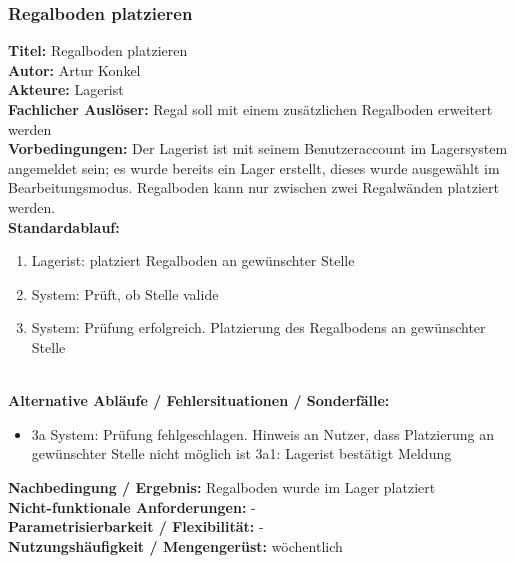 \subsubsection{Regalboden platzieren}
\textbf{Titel:} Regalboden platzieren\\
\textbf{Autor:} Artur Konkel\\
\textbf{Akteure:} Lagerist\\
\textbf{Fachlicher Auslöser:} Regal soll mit einem zusätzlichen Regalboden erweitert werden\\
\textbf{Vorbedingungen:} Der Lagerist ist mit seinem Benutzeraccount im Lagersystem angemeldet sein; es wurde
bereits ein Lager erstellt, dieses wurde ausgewählt im Bearbeitungsmodus. Regalboden kann nur zwischen zwei
Regalwänden platziert werden.\\
\textbf{Standardablauf:}
\begin{enumerate}
	\item Lagerist: platziert Regalboden an gewünschter Stelle
	\item System: Prüft, ob Stelle valide
	\item System: Prüfung erfolgreich. Platzierung des Regalbodens an gewünschter Stelle
\end{enumerate}\\
\textbf{Alternative Abläufe / Fehlersituationen / Sonderfälle:}
\begin{itemize}
	\item 3a System: Prüfung fehlgeschlagen. Hinweis an Nutzer, dass Platzierung an gewünschter Stelle nicht möglich ist
	\subitem 3a1: Lagerist bestätigt Meldung
\end{itemize}
\textbf{Nachbedingung / Ergebnis:} Regalboden wurde im Lager platziert\\
\textbf{Nicht-funktionale Anforderungen:} - \\
\textbf{Parametrisierbarkeit / Flexibilität:} - \\
\textbf{Nutzungshäufigkeit / Mengengerüst:} wöchentlich\\

